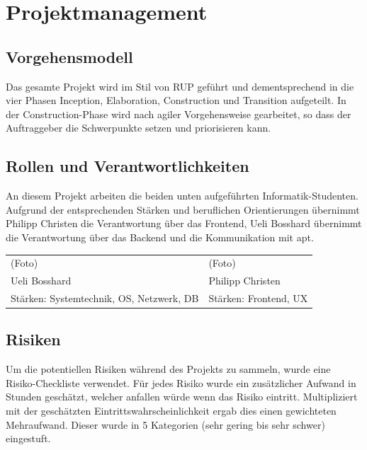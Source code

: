 
\chapter{Projektmanagement}
\section{Vorgehensmodell}

Das gesamte Projekt wird im Stil von RUP geführt und dementsprechend in die vier Phasen Inception, Elaboration, Construction und Transition aufgeteilt. In der Construction-Phase wird nach agiler Vorgehensweise gearbeitet, so dass der Auftraggeber die Schwerpunkte setzen und priorisieren kann.

\xxx[Grafik?]

\section{Rollen und Verantwortlichkeiten}

An diesem Projekt arbeiten die beiden unten aufgeführten Informatik-Studenten. Aufgrund der entsprechenden Stärken und beruflichen Orientierungen übernimmt Philipp Christen die Verantwortung über das Frontend, Ueli Bosshard übernimmt die Verantwortung über das Backend und die Kommunikation mit apt.

\xxx[Fotos]

\begin{tabular}{ | l | l | }
    (Foto) & (Foto) \\
    Ueli Bosshard & Philipp Christen \\
    Stärken: Systemtechnik, OS, Netzwerk, DB
    &
    Stärken: Frontend, UX\\
\end{tabular}

\section{Risiken}\label{sec:risiken}

Um die potentiellen Risiken während des Projekts zu sammeln, wurde eine  Risiko-Checkliste verwendet. Für jedes Risiko wurde ein zusätzlicher Aufwand in Stunden geschätzt, welcher anfallen würde wenn das Risiko eintritt. Multipliziert mit der geschätzten Eintrittswahrscheinlichkeit ergab dies einen gewichteten Mehraufwand. Dieser wurde in 5 Kategorien (sehr gering bis sehr schwer) eingestuft.

